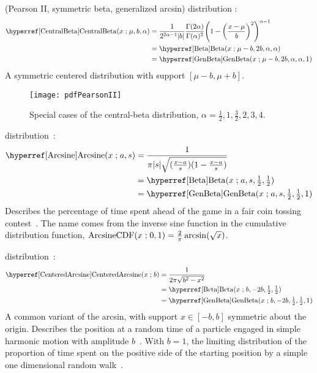  (Pearson II, symmetric beta, generalized arcsin) distribution \cite{Pearson1895}: 
%
\begin{align}
\label{CentralBeta}
\opr{CentralBeta}(x\given \mu, b,\alpha) 
&= \frac{1}{2^{2\alpha-1}  |b|}\frac{\Gamma(2\alpha) }{ \Gamma(\alpha)^2 } \Left(1-\Left(\frac{x-\mu}{ b}\Right)^2 \Right)^{\alpha-1}
\checked
 \\
& = \opr{Beta}(x\given \mu-b, 2b,\alpha, \alpha) 
\notag  \checked \\
& = \opr{GenBeta}(x\given \mu-b, 2 b ,\alpha, \alpha,1) \notag
\checked
\end{align}
A symmetric centered distribution with support $[\mu-b, \mu+b]$.

\begin{figure}[tp!]
\begin{center}
\texttt{[image: pdfPearsonII]}
\end{center}
\caption[Central-beta distributions]{Special cases of the central-beta distribution, $\alpha=\tfrac{1}{2}, 1, \tfrac{3}{2}, 2, 3, 4$.}
\end{figure}


 distribution~\cite{Norton1975}:
\begin{align}
\label{Arcsine}
\opr{Arcsine}(x\given a, s) &= \frac{1}{\pi |s| \sqrt{(\tfrac{x-a}{s}) (1-\frac{x-a}{s} )}} \checked \\
& =\opr{Beta}(x\given a,s,   \tfrac{1}{2},  \tfrac{1}{2}) \notag \checked \\
& =\opr{GenBeta}(x\given a,s, \tfrac{1}{2}, \tfrac{1}{2},1) \notag \checked
\end{align}
Describes the percentage of time spent ahead of the game in a fair coin tossing contest~\cite{Johnson1995,Norton1975}. The name comes from the inverse sine function in the cumulative distribution function,
$
\operatorname{ArcsineCDF}(x\mathrel{;} 0,1) = \frac{2}{\pi} \operatorname{arcsin}( \sqrt{x}) 
$.



 
 distribution~\cite{Norton1975}: 
\begin{align}
\label{CenteredArcsine}
\opr{CenteredArcsine}(x\given b) &= \frac{1}{2 \pi  \sqrt{b^2-x^2}} \checked \\
& =\opr{Beta}(x\given b,-2b, \tfrac{1}{2}, \tfrac{1}{2})  \checked \notag \\
& =\opr{GenBeta}(x\given b,-2b, \tfrac{1}{2}, \tfrac{1}{2},1)  \checked \notag
\end{align}
A common variant of the arcsin, with support $x\in [-b,b]$ symmetric about the origin. Describes the position at a random time of a particle engaged in simple harmonic motion with amplitude $b$~\cite{Norton1975}. With $b=1$, the limiting distribution of the proportion of time spent on the positive side of the starting position by a simple one dimensional random walk~\cite{Feller1968}.


